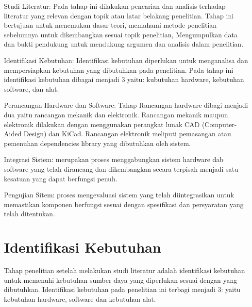 \begin{packed_enum}
	\item Studi Literatur: Pada tahap ini dilakukan pencarian dan analisis terhadap literatur yang relevan dengan topik atau latar belakang penelitian. Tahap ini bertujuan untuk menemukan dasar teori, memahami metode penelitian sebelumnya untuk dikembangkan sesuai topik penelitian, Mengumpulkan data dan bukti pendukung untuk mendukung argumen dan analisis dalam penelitian.
	\item Identifikasi Kebutuhan: Identifikasi kebutuhan diperlukan untuk menganalisa dan mempersiapkan kebutuhan yang dibutuhkan pada penelitian. Pada tahap ini identifikasi kebutuhan dibagai menjadi 3 yaitu: kubutuhan hardware, kebutuhan software, dan alat.
	\item Perancangan Hardware dan Software: Tahap Rancangan hardware dibagi menjadi dua yaitu rancangan mekanik dan elektronik. Rancangan mekanik maupun elektronik dilakukan dengan menggunakan perangkat lunak CAD (Computer-Aided Design) dan KiCad. Rancangan elektronik meliputi pemasangan atau pemenuhan dependencies library yang dibutuhkan oleh sistem.
	\item Integrasi Sistem: merupakan proses menggabungkan sistem hardware dab software yang telah dirancang dan dikembangkan secara terpisah menjadi satu kesatuan yang dapat berfungsi penuh.
	\item Pengujian Sitem: proses mengevaluasi sistem yang telah diintegrasikan untuk memastikan komponen berfungsi sesuai dengan spesifikasi dan persyaratan yang telah ditentukan.
\end{packed_enum}

\section{Identifikasi Kebutuhan}
Tahap penelitian setelah melakukan studi literatur adalah identifikasi kebutuhan untuk memenuhi kebutuhan sumber daya yang diperlukan sesuai dengan yang dibutuhkan. Identifikasi kebutuhan pada penelitian ini terbagi menjadi 3: yaitu kebutuhan hardware, software dan kebutuhan alat.

